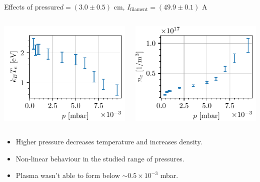 \documentclass[10pt]{beamer}
\newcommand{\filamentcurrent}{\ensuremath{I_{\mathrm{filament}}}}
\begin{document}
\begin{frame}{Effects of pressure}{$d = (3.0 \pm 0.5)$ cm, $\filamentcurrent = (49.9 \pm 0.1)$ A}

    \begin{columns}
        \centering
        {\includegraphics[scale=1]{../figures/temperatureeV_pressure.pdf}}


        \centering
        {\includegraphics[scale=1]{../figures/density_pressure.pdf}}

    \end{columns}
    \begin{itemize}
        \vspace{0.5cm}
        \item Higher pressure decreases temperature and increases density.
        \item Non-linear behaviour in the studied range of pressures.
        \item Plasma wasn't able to form below $\sim 0.5 \times 10^{-3}$ mbar.
    \end{itemize}
\end{frame}
\end{document}

